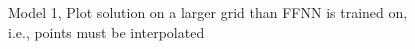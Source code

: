 \begin{figure}[H]
\centering
{}
\qquad
{}
\qquad
{}
\caption{Model 1, Plot solution on a larger grid than FFNN is trained on, i.e., points must be interpolated}
\label{fig:heat_nn2}
\end{figure}

